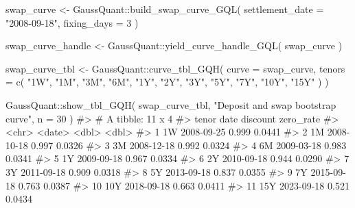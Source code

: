 \documentclass[
  letterpaper,
  DIV=11,
  numbers=noendperiod]{scrreprt}
\newenvironment{Shaded}{\begin{snugshade}}{\end{snugshade}}
\newcommand{\AttributeTok}[1]{\textcolor[rgb]{0.40,0.45,0.13}{#1}}
\newcommand{\CommentTok}[1]{\textcolor[rgb]{0.37,0.37,0.37}{#1}}
\newcommand{\DecValTok}[1]{\textcolor[rgb]{0.68,0.00,0.00}{#1}}
\newcommand{\FunctionTok}[1]{\textcolor[rgb]{0.28,0.35,0.67}{#1}}
\newcommand{\NormalTok}[1]{\textcolor[rgb]{0.00,0.23,0.31}{#1}}
\newcommand{\OtherTok}[1]{\textcolor[rgb]{0.00,0.23,0.31}{#1}}
\newcommand{\SpecialCharTok}[1]{\textcolor[rgb]{0.37,0.37,0.37}{#1}}
\newcommand{\StringTok}[1]{\textcolor[rgb]{0.13,0.47,0.30}{#1}}
\begin{document}
\begin{Shaded}
\begin{Highlighting}[]
\NormalTok{swap\_curve }\OtherTok{\textless{}{-}}\NormalTok{ GaussQuant}\SpecialCharTok{::}\FunctionTok{build\_swap\_curve\_GQL}\NormalTok{(}
  \AttributeTok{settlement\_date =} \StringTok{"2008{-}09{-}18"}\NormalTok{,}
  \AttributeTok{fixing\_days =} \DecValTok{3}
\NormalTok{)}

\NormalTok{swap\_curve\_handle }\OtherTok{\textless{}{-}}\NormalTok{ GaussQuant}\SpecialCharTok{::}\FunctionTok{yield\_curve\_handle\_GQL}\NormalTok{(}
\NormalTok{  swap\_curve}
\NormalTok{)}

\NormalTok{swap\_curve\_tbl }\OtherTok{\textless{}{-}}\NormalTok{ GaussQuant}\SpecialCharTok{::}\FunctionTok{curve\_tbl\_GQH}\NormalTok{(}
  \AttributeTok{curve =}\NormalTok{ swap\_curve,}
  \AttributeTok{tenors =} \FunctionTok{c}\NormalTok{(}
    \StringTok{"1W"}\NormalTok{, }\StringTok{"1M"}\NormalTok{, }\StringTok{"3M"}\NormalTok{, }\StringTok{"6M"}\NormalTok{,}
    \StringTok{"1Y"}\NormalTok{, }\StringTok{"2Y"}\NormalTok{, }\StringTok{"3Y"}\NormalTok{, }\StringTok{"5Y"}\NormalTok{,}
    \StringTok{"7Y"}\NormalTok{, }\StringTok{"10Y"}\NormalTok{, }\StringTok{"15Y"}
\NormalTok{  )}
\NormalTok{)}

\NormalTok{GaussQuant}\SpecialCharTok{::}\FunctionTok{show\_tbl\_GQH}\NormalTok{(}
\NormalTok{  swap\_curve\_tbl,}
  \StringTok{"Deposit and swap bootstrap curve"}\NormalTok{,}
  \AttributeTok{n =} \DecValTok{30}
\NormalTok{)}
\CommentTok{\#\textgreater{} \# A tibble: 11 x 4}
\CommentTok{\#\textgreater{}    tenor date       discount zero\_rate}
\CommentTok{\#\textgreater{}    \textless{}chr\textgreater{} \textless{}date\textgreater{}        \textless{}dbl\textgreater{}     \textless{}dbl\textgreater{}}
\CommentTok{\#\textgreater{}  1 1W    2008{-}09{-}25    0.999    0.0441}
\CommentTok{\#\textgreater{}  2 1M    2008{-}10{-}18    0.997    0.0326}
\CommentTok{\#\textgreater{}  3 3M    2008{-}12{-}18    0.992    0.0324}
\CommentTok{\#\textgreater{}  4 6M    2009{-}03{-}18    0.983    0.0341}
\CommentTok{\#\textgreater{}  5 1Y    2009{-}09{-}18    0.967    0.0334}
\CommentTok{\#\textgreater{}  6 2Y    2010{-}09{-}18    0.944    0.0290}
\CommentTok{\#\textgreater{}  7 3Y    2011{-}09{-}18    0.909    0.0318}
\CommentTok{\#\textgreater{}  8 5Y    2013{-}09{-}18    0.837    0.0355}
\CommentTok{\#\textgreater{}  9 7Y    2015{-}09{-}18    0.763    0.0387}
\CommentTok{\#\textgreater{} 10 10Y   2018{-}09{-}18    0.663    0.0411}
\CommentTok{\#\textgreater{} 11 15Y   2023{-}09{-}18    0.521    0.0434}
\end{Highlighting}
\end{Shaded}
\end{document}
